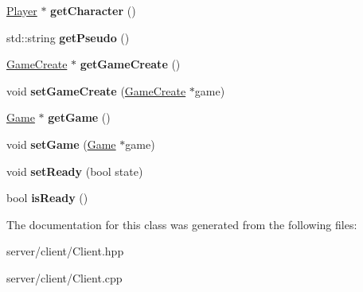 \begin{DoxyCompactItemize}
\item 
\hypertarget{class_client_af6179cbf6e56766ec4713014db188da4}{\hyperlink{class_player}{Player} $\ast$ {\bfseries get\-Character} ()}\label{class_client_af6179cbf6e56766ec4713014db188da4}

\item 
\hypertarget{class_client_ae09b4ddc3d70e5a145e910290c3aea72}{std\-::string {\bfseries get\-Pseudo} ()}\label{class_client_ae09b4ddc3d70e5a145e910290c3aea72}

\item 
\hypertarget{class_client_a657883c73b759c62142ca4d1e11f66fc}{\hyperlink{class_game_create}{Game\-Create} $\ast$ {\bfseries get\-Game\-Create} ()}\label{class_client_a657883c73b759c62142ca4d1e11f66fc}

\item 
\hypertarget{class_client_a272fd2ca4399673c8128909bf4dc528a}{void {\bfseries set\-Game\-Create} (\hyperlink{class_game_create}{Game\-Create} $\ast$game)}\label{class_client_a272fd2ca4399673c8128909bf4dc528a}

\item 
\hypertarget{class_client_a6ad601bf1f1fe3e6516e111716c13758}{\hyperlink{class_game}{Game} $\ast$ {\bfseries get\-Game} ()}\label{class_client_a6ad601bf1f1fe3e6516e111716c13758}

\item 
\hypertarget{class_client_a53405ecfa204a3eef04b77072e9e6a33}{void {\bfseries set\-Game} (\hyperlink{class_game}{Game} $\ast$game)}\label{class_client_a53405ecfa204a3eef04b77072e9e6a33}

\item 
\hypertarget{class_client_a18a102852a796bbeac5a6b145586b8d0}{void {\bfseries set\-Ready} (bool state)}\label{class_client_a18a102852a796bbeac5a6b145586b8d0}

\item 
\hypertarget{class_client_a6148446e0ee89272c5bb16f03f4e46fc}{bool {\bfseries is\-Ready} ()}\label{class_client_a6148446e0ee89272c5bb16f03f4e46fc}

\end{DoxyCompactItemize}


The documentation for this class was generated from the following files\-:\begin{DoxyCompactItemize}
\item 
server/client/Client.\-hpp\item 
server/client/Client.\-cpp\end{DoxyCompactItemize}

